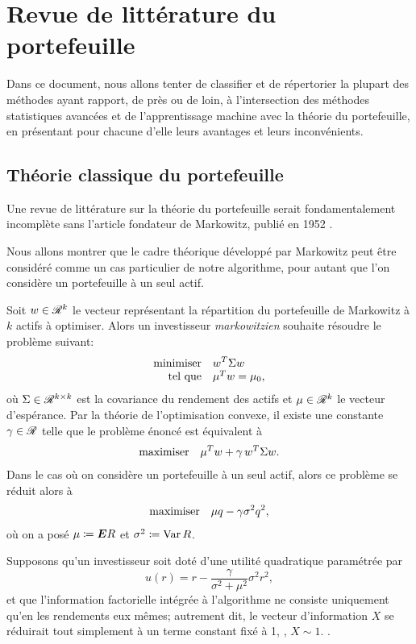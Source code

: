 \section{Revue de littérature du portefeuille}


Dans ce document, nous allons tenter de classifier et de répertorier la plupart des
méthodes ayant rapport, de près ou de loin, à l'intersection des méthodes statistiques
avancées et de l'apprentissage machine avec la théorie du portefeuille, en présentant pour
chacune d'elle leurs avantages et leurs inconvénients.

\subsection{Théorie classique du portefeuille}

Une revue de littérature sur la théorie du portefeuille serait fondamentalement incomplète
sans l'article fondateur de Markowitz, publié en 1952 \cite{markowitz1952portfolio}.

Nous allons montrer que le cadre théorique développé par Markowitz peut être considéré
comme un cas particulier de notre algorithme, pour autant que l'on considère un portefeuille
à un seul actif.

Soit $w\in\mathscr{R}^k$ le vecteur représentant la répartition du portefeuille de Markowitz à
$k$ actifs à optimiser. Alors un investisseur \textit{markowitzien} souhaite résoudre le
problème suivant:
\begin{equation}
  \minimizeEquationSt{w^T\Sigma w}[\mu^Tw = \mu_0,]
\end{equation}
où $\Sigma\in\mathscr{R}^{k\times k}$ est la covariance du rendement des actifs et
$\mu\in\mathscr{R}^k$ le vecteur d'espérance.   Par la théorie de
l'optimisation convexe, il existe une constante $\gamma\in\mathscr{R}$ telle que le problème énoncé est
équivalent à
\begin{equation}
  \begin{array}{ll}\operatorname*{maximiser} & \displaystyle{\mu^Tw + \gamma\,w^T\Sigma w.}\end{array}
\end{equation}
Dans le cas où on considère un portefeuille à un seul actif, alors ce problème se réduit
alors à
\begin{equation}
  \label{markov}
  \begin{array}{ll}\operatorname*{maximiser} & \displaystyle{\mu q - \gamma\sigma^2 q^2,}\end{array}
\end{equation}
où on a posé $\mu \coloneqq \bm E R$ et $\sigma^2 \coloneqq \operatorname{\bm{Var}} R$.

Supposons qu'un investisseur soit doté d'une utilité quadratique paramétrée par
\begin{equation}
  \label{quadu}
  u(r) = r - \frac{\gamma}{\sigma^2+\mu^2}\sigma^2r^2,
\end{equation}
et que l'information factorielle intégrée à l'algorithme ne consiste uniquement qu'en les
rendements eux mêmes; autrement dit, le vecteur d'information $X$ se réduirait tout
simplement à un terme constant fixé à 1, \ie, $X\sim 1$. . 

